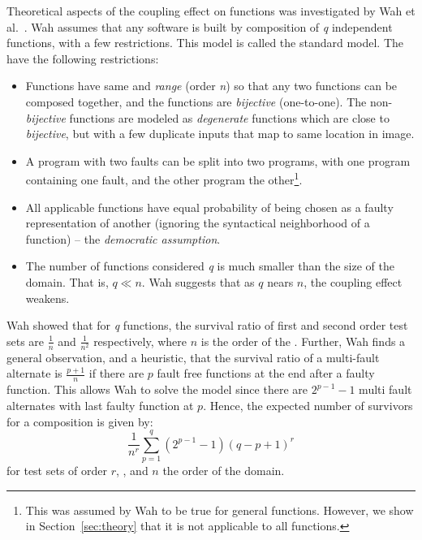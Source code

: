 \documentclass[preprint,nonatbib]{sigplanconf}\usepackage[]{graphicx}\usepackage[]{color}
\begin{document}
Theoretical aspects of the coupling effect
on functions was investigated by Wah et al.~\cite{wah1995fault,wah2000atheoretical,wah2003ananalysis}. Wah
assumes that any software is built by composition of \emph{q} independent functions, with
a few restrictions. This model is called the standard \qfunction model.
The \qfunctions have the following restrictions:
\begin{itemize}
  \item Functions have same \finput and \emph{range} (order \emph{n}) so that any two
    functions can be composed together, and the functions are \emph{bijective} (one-to-one).
    The non-\emph{bijective} functions are modeled as \emph{degenerate} functions which
    are close to \emph{bijective}, but with a few duplicate inputs that map to
    same location in image.
  \item A program with two faults can be split into two programs, with one program
    containing one fault, and the other program the other\footnote{
      This was assumed by Wah to be true for general functions. However, we
      show in Section~\ref{sec:theory} that it is not applicable to
      all functions.
    }.
  \item All applicable functions have equal probability of being chosen as a faulty
       representation of another (ignoring the
       syntactical neighborhood of a function) -- the \emph{democratic assumption}.
  \item The number of functions considered \emph{q} is much smaller than the size of the domain. That is, $q \ll n$.
     Wah suggests that as $q$ nears $n$, the coupling effect weakens.
\end{itemize}
Wah showed that for \emph{q} functions, the survival ratio of first and second
order test sets are $\frac{1}{n}$ and $\frac{1}{n^2}$ respectively,  where $n$ is
the order of the \finput. %
Further, Wah finds a general observation, and a heuristic, that the survival
ratio of a multi-fault alternate is $\frac{p+1}{n}$ if there are $p$ fault free
functions at the end after a faulty function. This allows Wah to solve the
\qfunction model since there are $2^{p-1}-1$ multi fault alternates with last
faulty function at $p$. Hence, the expected number of survivors for a \qfunction
composition is given by:
\[
  \frac{1}{n^r} \sum_{p=1}^{q} (2^{p-1} -1) (q - p + 1)^r
\]
for test sets of order $r$, \qfunctions, and $n$ the order of the domain.
\end{document}
